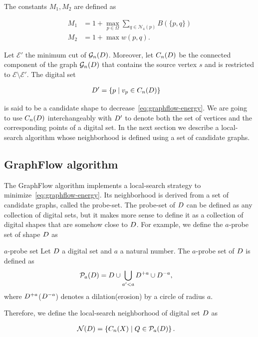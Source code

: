 The constants $M_1,M_2$ are defined as

\begin{align*}
M_1 &= 1 + \max_{p \in \Omega}{\sum_{q \in \mathcal{N}_4(p)}}{B(\{p,q\})} \\
M_2 &= 1 + \max w(p,q).
\end{align*}


Let $\mathcal{E}'$ the minimum cut of $\mathcal{G}_n(D)$. Moreover, let $C_n(D)$ be the connected component of the graph $\mathcal{G}_n(D)$ that contains the source vertex $s$ and is restricted to $\mathcal{E} \setminus \mathcal{E}'$. The digital set 

\begin{align*}
	D' &= \{ p \; | \; v_p \in C_n(D) \}
\end{align*}

is said to be a candidate shape to decrease~\cref{eq:graphflow-energy}. We are going to use $C_n(D)$ interchangeably with $D'$ to denote both the set of vertices and the corresponding points of a digital set. In the next section we describe a local-search algorithm whose neighborhood is defined using a set of candidate graphs.
 

\subsection{GraphFlow algorithm}
	The GraphFlow algorithm implements a local-search strategy to minimize~\cref{eq:graphflow-energy}. Its neighborhood is derived from a set of candidate graphs, called the probe-set. 	
	The probe-set of $D$ can be defined as any collection of digital sets, but it makes more sense to define it as a collection of digital shapes that are somehow close to $D$. For example, we define the $a$-probe set of shape $D$ as

\begin{definition}{$a$-probe set}
	Let $D$ a digital set and $a$ a natural number. The $a$-probe set of $D$ is defined as
	\begin{align*}
		\mathcal{P}_a(D) &= D \cup \bigcup_{a' < a}{D^{+a} \cup D^{-a}},
	\end{align*}
	where $D^{+a}$($D^{-a}$) denotes a dilation(erosion) by a circle of radius $a$.
\end{definition}

Therefore, we define the local-search neighborhood of digital set $D$ as

\begin{align*}
	\mathcal{N}(D) &= \left \{ C_n(X) \; | \; Q \in \mathcal{P}_a(D) \right\}.
\end{align*}


